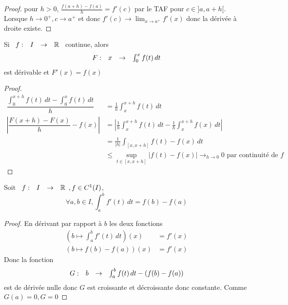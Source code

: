 \documentclass[]{report}
\begin{document}
\begin{proof}
    pour $h>0$, $\frac{f(a+h)-f(a)}{h}=f'(c)$ par le TAF pour $c\in ]a,a+h[$.\\
    Lorsque $h\to 0^+, c\to a^+$ et donc $f'(c)\to \lim_{x\to a^+} f'(x)$ donc la dérivée à droite existe.
\end{proof}

\begin{prop}{}{}
    Si $\begin{array}{ccccc} f : & I & \to & \mathbb{R} \end{array}$ continue, alors
    \[\begin{array}{ccccc} F : & x & \to & \int_{0}^{x} f(t)\, dt \end{array}\]
    est dérivable et $F'(x)=f(x)$
\end{prop}

\begin{proof}
    \begin{align*}
        \dfrac{\int_{0}^{x+h} f(t)\, dt -\int_{0}^{x} f(t)\, dt}{h} & =\frac{1}{h} \int_{x}^{x+h}f(t)\, dt                                                                  \\
        \left|\dfrac{F(x+h)-F(x)}{h}-f(x)\right|                    & = \left|\frac{1}{h} \int_{x}^{x+h} f(t)\, dt-\frac{1}{h} \int_{x}^{x+h} f(x)\, dt\right|              \\
                                                                    & = \frac{1}{|h|}\int_{[x,x+h]} f(t)-f(x)\, dt                                                          \\
                                                                    & \le \sup_{t\in [x,x+h]} \left| f(t)-f(x)\right|\longrightarrow_{h\to 0}0\text{ par continuité de $f$}
    \end{align*}
\end{proof}

\begin{prop}{}{}
    Soit $\begin{array}{ccccc} f : & I & \to & \mathbb{R} \end{array},f\in C^1(I)$,
    \[\forall a,b\in I, \int_{a}^{b} f'(t)\, dt= f(b)-f(a)\]
\end{prop}

\begin{proof}
    En dérivant par rapport à $b$ les deux fonctions
    \begin{align*}
        (b\mapsto \int_{a}^{b} f'(t)\, dt)(x) & = f'(x) \\
        (b\mapsto f(b)-f(a))(x)               & =f'(x)
    \end{align*}
    Donc la fonction
    \[\begin{array}{ccccc} G : & b & \to & \int_{a}^{b} f(t)\, dt -(f(b)-f(a)) \end{array}\]
    est de dérivée nulle donc $G$ est croissante et décroissante donc constante. Comme $G(a)=0,G=0$
\end{proof}
\end{document}
